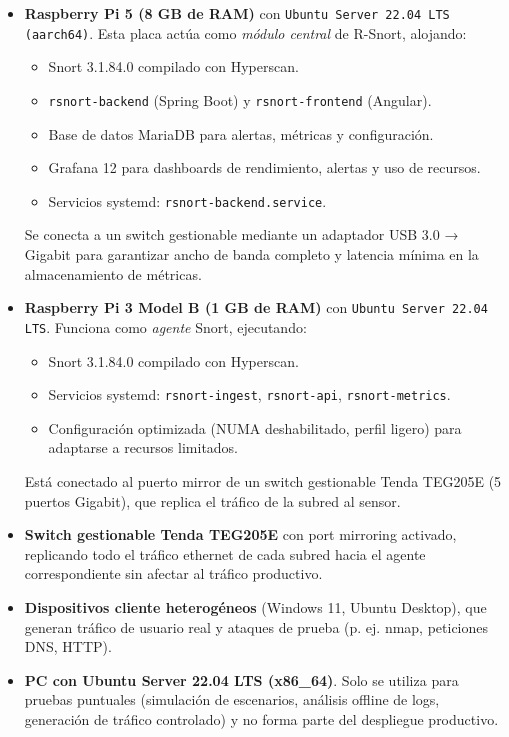 \documentclass[11pt,a4paper,twoside]{report}
\begin{document}
\begin{itemize}
	\item \textbf{Raspberry Pi 5 (8 GB de RAM)} con \texttt{Ubuntu Server 22.04 LTS (aarch64)}. Esta placa actúa como \emph{módulo central} de R-Snort, alojando:
	\begin{itemize}
		\item Snort 3.1.84.0 compilado con Hyperscan.
		\item \texttt{rsnort-backend} (Spring Boot) y \texttt{rsnort-frontend} (Angular).
		\item Base de datos MariaDB para alertas, métricas y configuración.
		\item Grafana 12 para dashboards de rendimiento, alertas y uso de recursos.
		\item Servicios systemd: \texttt{rsnort-backend.service}.
	\end{itemize}
	Se conecta a un switch gestionable mediante un adaptador USB 3.0 → Gigabit para garantizar ancho de banda completo y latencia mínima en la almacenamiento de métricas.
	
	\item \textbf{Raspberry Pi 3 Model B (1 GB de RAM)} con \texttt{Ubuntu Server 22.04 LTS}. Funciona como \emph{agente} Snort, ejecutando:
	\begin{itemize}
		\item Snort 3.1.84.0 compilado con Hyperscan.
		\item Servicios systemd: \texttt{rsnort-ingest}, \texttt{rsnort-api}, \texttt{rsnort-metrics}.
		\item Configuración optimizada (NUMA deshabilitado, perfil ligero) para adaptarse a recursos limitados.
	\end{itemize}
	Está conectado al puerto mirror de un switch gestionable Tenda TEG205E (5 puertos Gigabit), que replica el tráfico de la subred al sensor.
	
	\item \textbf{Switch gestionable Tenda TEG205E} con port mirroring activado, replicando todo el tráfico ethernet de cada subred hacia el agente correspondiente sin afectar al tráfico productivo.
	
	\item \textbf{Dispositivos cliente heterogéneos} (Windows 11, Ubuntu Desktop), que generan tráfico de usuario real y ataques de prueba (p. ej. nmap, peticiones DNS, HTTP).
	
	\item \textbf{PC con Ubuntu Server 22.04 LTS (x86\_64)}. Solo se utiliza para pruebas puntuales (simulación de escenarios, análisis offline de logs, generación de tráfico controlado) y no forma parte del despliegue productivo.
\end{itemize}
\end{document}
